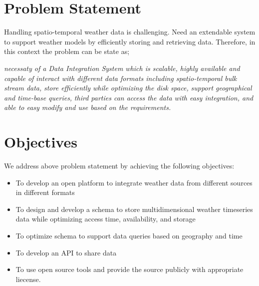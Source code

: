 \section{Problem Statement}
Handling spatio-temporal weather data is challenging. Need an extendable system to support weather models by efficiently storing and retrieving data. Therefore, in this context the problem can be state as;

\emph{necessaty of a Data Integration System which is scalable, highly available and capable of }
\emph{interact with different data formats including spatio-temporal bulk stream data, }
\emph{store efficiently while optimizing the disk space, }
\emph{support geographical and time-base queries, }
\emph{third parties can access the data with easy integration, and }
\emph{able to easy modify and use based on the requirements.}

\section{Objectives}
We address above problem statement by achieving the following objectives:
\begin{itemize}
    \item To develop an open platform to integrate weather data from different sources in different formats
    \item To design and develop a schema to store multidimensional weather timeseries data while optimizing access time, availability, and storage
    \item To optimize schema to support data queries based on geography and time
    \item To develop an API to share data
    \item To use open source tools and provide the source publicly with appropriate liecense.
\end{itemize}

